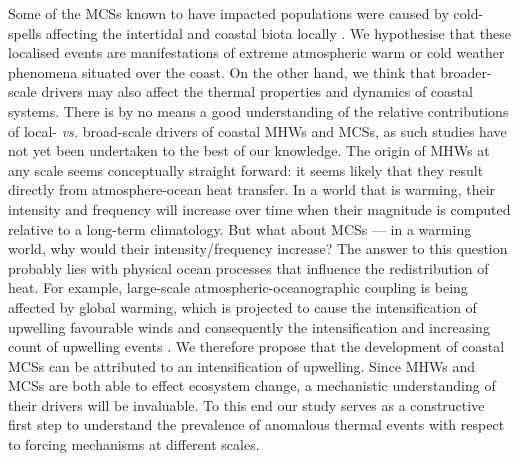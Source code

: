 \documentclass[a4paper,10pt,review]{elsarticle}
\begin{document}
Some of the MCSs known to have impacted populations were caused by cold-spells affecting the intertidal and coastal biota locally \citep{Gunter1941, Firth2011}. We hypothesise that these localised events are manifestations of extreme atmospheric warm or cold weather phenomena situated over the coast. On the other hand, we think that broader-scale drivers may also affect the thermal properties and dynamics of coastal systems. There is by no means a good understanding of the relative contributions of local- \emph{vs.} broad-scale drivers of coastal MHWs and MCSs, as such studies have not yet been undertaken to the best of our knowledge. The origin of MHWs at any scale seems conceptually straight forward: it seems likely that they result directly from atmosphere-ocean heat transfer. In a world that is warming, their intensity and frequency will increase over time when their magnitude is computed relative to a long-term climatology. But what about MCSs --- in a warming world, why would their intensity/frequency increase? The answer to this question probably lies with physical ocean processes that influence the redistribution of heat. For example, large-scale atmospheric-oceanographic coupling is being affected by global warming, which is projected to cause the intensification of upwelling favourable winds and consequently the intensification and increasing count of upwelling events \citep[see][for a review of this and alternative hypotheses]{Garcia-Reyes2015}. We therefore propose that the development of coastal MCSs can be attributed to an intensification of upwelling. Since MHWs and MCSs are both able to effect ecosystem change, a mechanistic understanding of their drivers will be invaluable. To this end our study serves as a constructive first step to understand the prevalence of anomalous thermal events with respect to forcing mechanisms at different scales.
\end{document}
